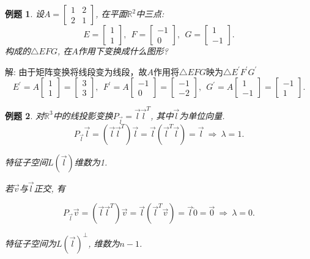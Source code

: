 \documentclass[a4paper]{book}
\newtheorem{eg}{例题}[chapter]
\begin{document}
\begin{eg}
设$A=\begin{bmatrix}1&2\\2&1\end{bmatrix}$, 在平面$\mathbb{R}^2$中三点:
$$E=\begin{bmatrix}1\\1\end{bmatrix}, \ \ F=\begin{bmatrix}-1\\0\end{bmatrix}, \ \
G=\begin{bmatrix}1\\-1\end{bmatrix}.$$
构成的$\triangle EFG$, 在$A$作用下变换成什么图形?
\end{eg}
解: 由于矩阵变换将线段变为线段，故$A$作用将$\triangle EFG$映为$\triangle E^{'}F^{'}G^{'}$
$$E^{'}=A\begin{bmatrix}1\\1\end{bmatrix}=\begin{bmatrix}3\\3\end{bmatrix},\ \ F^{'}=A\begin{bmatrix}-1\\0\end{bmatrix}=\begin{bmatrix}-1\\-2\end{bmatrix},\ \ G^{'}=A\begin{bmatrix}1\\-1\end{bmatrix}=\begin{bmatrix}-1\\1\end{bmatrix}.$$


\begin{eg}
对$\mathbb{R}^3$中的线投影变换$P_{\vec{l}}=\vec{l}\vec{l}^T$, 其中$\vec{l}$为单位向量.
\begin{displaymath}P_{\vec{l}}\vec{l}=(\vec{l}\vec{l}^T)\vec{l}
=\vec{l}(\vec{l}^T\vec{l})=\vec{l}\ \Rightarrow\ \lambda=1.\end{displaymath}

特征子空间$L(\vec{l})$维数为1.

若$\vec{v}$与$\vec{l}$正交, 有

$$P_{\vec{l}}\vec{v}=(\vec{l}\vec{l}^T)\vec{v}
=\vec{l}(\vec{l}^T\vec{v})=\vec{l}\dot 0=\vec{0}\ \Rightarrow \ \lambda=0.$$

特征子空间为$L(\vec{l})^{\bot}$, 维数为$n-1$.

\end{eg}
\end{document}
